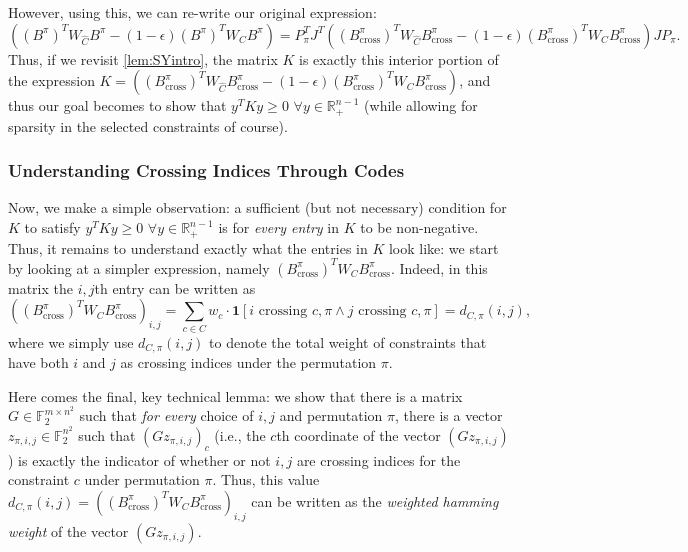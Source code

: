 \documentclass[11pt]{article}
\theoremstyle{definition}
\newcommand{\F}{\mathbb{F}}
\newcommand{\R}{\mathbb{R}}
\newcommand{\eps}{\epsilon}
\begin{document}
However, using this, we can re-write our original expression:
\[
\left ( (B^{\pi})^T W_{\hat{C}} B^{\pi} - (1 - \eps)(B^{\pi})^T W_{C} B^{\pi}  \right ) = P_{\pi}^T J^T ( (B_{\mathrm{cross}}^{\pi})^T W_{\hat{C}} B_{\mathrm{cross}}^{\pi} - (1 - \eps)(B_{\mathrm{cross}}^{\pi})^T W_{C} B_{\mathrm{cross}}^{\pi}) J P_{\pi}.
\]
Thus, if we revisit \cref{lem:SYintro}, the matrix $K$ is exactly this interior portion of the expression $K = ( (B_{\mathrm{cross}}^{\pi})^T W_{\hat{C}} B_{\mathrm{cross}}^{\pi} - (1 - \eps)(B_{\mathrm{cross}}^{\pi})^T W_{C} B_{\mathrm{cross}}^{\pi})$, and thus our goal becomes to show that $y^TKy \geq 0$ $\forall y \in \R_+^{n-1}$ (while allowing for sparsity in the selected constraints of course). 

\subsubsection{Understanding Crossing Indices Through Codes}

Now, we make a simple observation: a sufficient (but not necessary) condition for $K$ to satisfy $y^TKy \geq 0$ $\forall y \in \R_+^{n-1}$ is for \emph{every entry} in $K$ to be non-negative. Thus, it remains to understand exactly what the entries in $K$ look like: we start by looking at a simpler expression, namely $(B_{\mathrm{cross}}^{\pi})^T W_{C} B_{\mathrm{cross}}^{\pi}$. Indeed, in this matrix the $i,j$th entry can be written as
\[
	\left ( (B_{\mathrm{cross}}^{\pi})^T W_{C} B_{\mathrm{cross}}^{\pi} \right)_{i,j}= \sum_{c \in C} w_c \cdot \mathbf{1}[i \text{ crossing } c,\pi \wedge j \text{ crossing } c,\pi] = d_{C, \pi}(i,j),
	\]
	where we simply use $d_{C, \pi}(i,j)$ to denote the total weight of constraints that have both $i$ and $j$ as crossing indices under the permutation $\pi$.
	
Here comes the final, key technical lemma: we show that there is a matrix $G \in \F_2^{m \times n^2}$ such that \emph{for every} choice of $i, j$ and permutation $\pi$, there is a vector $z_{\pi, i, j} \in \F_2^{n^2}$ such that $(G z_{\pi, i, j})_{c}$ (i.e., the $c$th coordinate of the vector $(G z_{\pi, i, j})$) is exactly the indicator of whether or not $i, j$ are crossing indices for the constraint $c$ under permutation $\pi$. Thus, this value $d_{C, \pi}(i,j) = \left ( (B_{\mathrm{cross}}^{\pi})^T W_{C} B_{\mathrm{cross}}^{\pi} \right)_{i,j}$ can be written as the \emph{weighted hamming weight} of the vector $(G z_{\pi, i, j})$.
\end{document}
